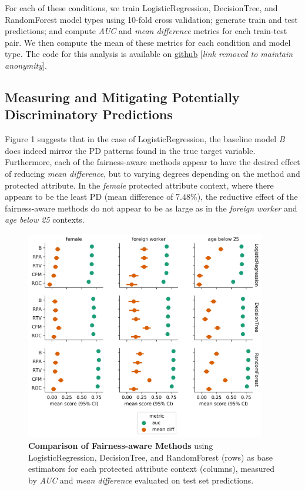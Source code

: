 \documentclass[man,natbib]{apa6}
\begin{document}
For each of these conditions, we train LogisticRegression, DecisionTree, and
RandomForest model types using 10-fold cross validation; generate train and test
predictions; and compute \emph{AUC} and \emph{mean difference} metrics for each
train-test pair. We then compute the mean of these metrics for each condition and
model type. The code for this analysis is available on
\underline{github} [\emph{link removed to maintain anonymity}].

\subsection{Measuring and Mitigating Potentially Discriminatory Predictions}

Figure 1 suggests that in the case of LogisticRegression, the baseline model
\emph{B} does indeed mirror the PD patterns found in the true target variable.
Furthermore, each of the fairness-aware methods appear to have the desired
effect of reducing \emph{mean difference}, but to varying degrees depending on
the method and protected attribute. In the \emph{female} protected attribute
context, where there appears to be the least PD (mean difference of \(7.48\%\)),
the reductive effect of the fairness-aware methods do not appear to be as
large as in the \emph{foreign worker} and \emph{age below 25} contexts.

\begin{figure}[h]
\centering
\includegraphics[width=10.5cm]{fairness_aware_comparison.png}
\caption{
  \textbf{Comparison of Fairness-aware Methods} using LogisticRegression,
  DecisionTree, and RandomForest (rows) as base estimators for each protected
  attribute context (columns), measured by \emph{AUC} and
  \emph{mean difference} evaluated on test set predictions.}
\label{figure-1-comparison-fa-methods}
\end{figure}
\end{document}
